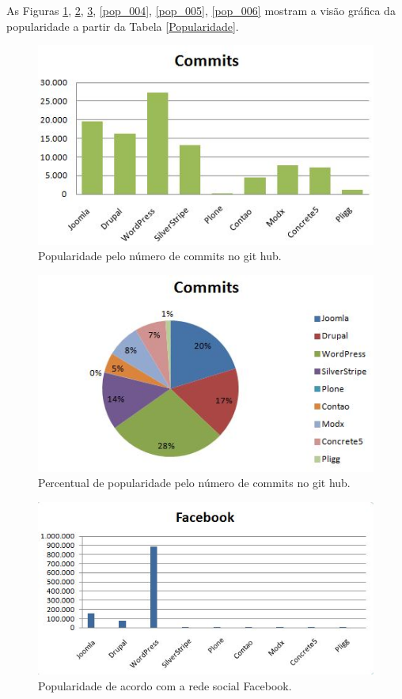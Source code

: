 As Figuras \ref{pop_001}, \ref{pop_002}, \ref{pop_003}, \ref{pop_004}, \ref{pop_005}, \ref{pop_006} mostram a visão gráfica da popularidade a partir da Tabela \ref{Popularidade}.


\begin{figure}[!ht]
\centering
\includegraphics[keepaspectratio=true,scale = 0.8]{figuras/commits.JPG}
\caption{Popularidade pelo número de commits no git hub.}
\label{pop_001}
\end{figure}

\begin{figure}[!h]
\centering
\includegraphics[keepaspectratio=true,scale = 0.9]{figuras/commits1.JPG}
\caption{Percentual de popularidade pelo número de commits no git hub.}
\label{pop_002}
\end{figure}

\clearpage
\begin{figure}[!ht]
\centering
\includegraphics[keepaspectratio=true,scale = 0.9]{figuras/facebook.JPG}
\caption{Popularidade de acordo com a rede social Facebook.}
\label{pop_003}
\end{figure}


